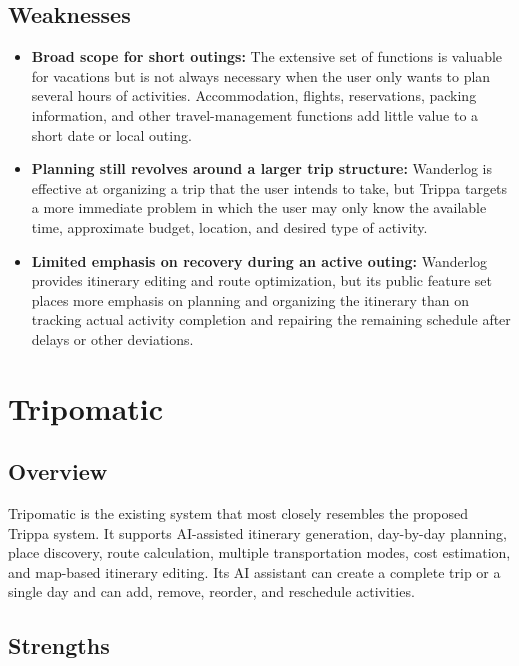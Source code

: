 \subsection{Weaknesses}

\begin{itemize}
\item \textbf{Broad scope for short outings:} The extensive set of functions is valuable for vacations but is not always necessary when the user only wants to plan several hours of activities. Accommodation, flights, reservations, packing information, and other travel-management functions add little value to a short date or local outing.
\item \textbf{Planning still revolves around a larger trip structure:} Wanderlog is effective at organizing a trip that the user intends to take, but Trippa targets a more immediate problem in which the user may only know the available time, approximate budget, location, and desired type of activity.
\item \textbf{Limited emphasis on recovery during an active outing:} Wanderlog provides itinerary editing and route optimization, but its public feature set places more emphasis on planning and organizing the itinerary than on tracking actual activity completion and repairing the remaining schedule after delays or other deviations.
\end{itemize}


\section{Tripomatic}

\subsection{Overview}

Tripomatic is the existing system that most closely resembles the proposed Trippa system. It supports AI-assisted itinerary generation, day-by-day planning, place discovery, route calculation, multiple transportation modes, cost estimation, and map-based itinerary editing. Its AI assistant can create a complete trip or a single day and can add, remove, reorder, and reschedule activities.


\subsection{Strengths}

